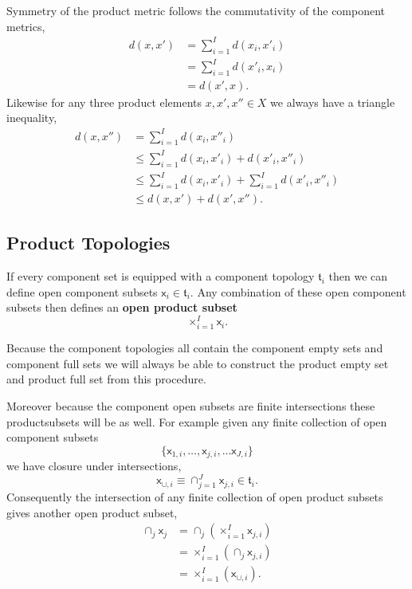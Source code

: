 \documentclass[
  letterpaper,
  DIV=11,
  numbers=noendperiod]{scrartcl}
\begin{document}
Symmetry of the product metric follows the commutativity of the
component metrics, \begin{align*}
d(x, x')
&= \sum_{i = 1}^{I} d(x_{i}, x'_{i})
\\
&= \sum_{i = 1}^{I} d(x'_{i}, x_{i})
\\
&= d(x', x).
\end{align*} Likewise for any three product elements
\(x, x', x'' \in X\) we always have a triangle inequality,
\begin{align*}
d(x, x'')
&=
\sum_{i = 1}^{I} d(x_{i}, x''_{i})
\\
&\le
\sum_{i = 1}^{I} d(x_{i}, x'_{i}) + d(x'_{i}, x''_{i})
\\
&\le
\sum_{i = 1}^{I} d(x_{i}, x'_{i}) + \sum_{i = 1}^{I} d(x'_{i}, x''_{i})
\\
&\le
d(x, x') + d(x', x'').
\end{align*}

\hypertarget{product-topologies}{%
\subsection{Product Topologies}\label{product-topologies}}

If every component set is equipped with a component topology
\(\mathfrak{t}_{i}\) then we can define open component subsets
\(\mathsf{x}_{i} \in \mathfrak{t}_{i}\). Any combination of these open
component subsets then defines an \textbf{open product subset} \[
\times_{i = 1}^{I} \mathsf{x}_{i}.
\]

Because the component topologies all contain the component empty sets
and component full sets we will always be able to construct the product
empty set and product full set from this procedure.

Moreover because the component open subsets are finite intersections
these productsubsets will be as well. For example given any finite
collection of open component subsets \[
\{ \mathsf{x}_{1, i}, \ldots, \mathsf{x}_{j, i}, \ldots \mathsf{x}_{J, i} \}
\] we have closure under intersections, \[
\mathsf{x}_{\cup, i}
\equiv \cap_{j = 1}^{J} \mathsf{x}_{j, i}
\in \mathfrak{t}_{i}.
\] Consequently the intersection of any finite collection of open
product subsets gives another open product subset, \begin{align*}
\cap_{j} \mathsf{x}_{j}
&=
\cap_{j} \left( \times_{i = 1}^{I} \mathsf{x}_{j, i} \right)
\\
&=
\times_{i = 1}^{I} \left( \cap_{j} \mathsf{x}_{j, i} \right)
\\
&=
\times_{i = 1}^{I} \left( \mathsf{x}_{\cup, i} \right).
\end{align*}
\end{document}
